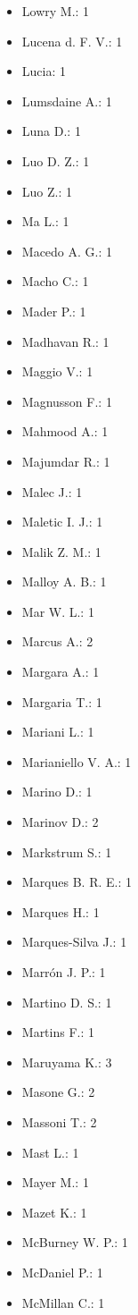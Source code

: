 \begin{itemize}
\item Lowry M.: 1
\item Lucena d. F. V.: 1
\item Lucia: 1
\item Lumsdaine A.: 1
\item Luna D.: 1
\item Luo D. Z.: 1
\item Luo Z.: 1
\item Ma L.: 1
\item Macedo A. G.: 1
\item Macho C.: 1
\item Mader P.: 1
\item Madhavan R.: 1
\item Maggio V.: 1
\item Magnusson F.: 1
\item Mahmood A.: 1
\item Majumdar R.: 1
\item Malec J.: 1
\item Maletic I. J.: 1
\item Malik Z. M.: 1
\item Malloy A. B.: 1
\item Mar W. L.: 1
\item Marcus A.: 2
\item Margara A.: 1
\item Margaria T.: 1
\item Mariani L.: 1
\item Marianiello V. A.: 1
\item Marino D.: 1
\item Marinov D.: 2
\item Markstrum S.: 1
\item Marques B. R. E.: 1
\item Marques H.: 1
\item Marques-Silva J.: 1
\item Marrón J. P.: 1
\item Martino D. S.: 1
\item Martins F.: 1
\item Maruyama K.: 3
\item Masone G.: 2
\item Massoni T.: 2
\item Mast L.: 1
\item Mayer M.: 1
\item Mazet K.: 1
\item McBurney W. P.: 1
\item McDaniel P.: 1
\item McMillan C.: 1

\end{itemize}

